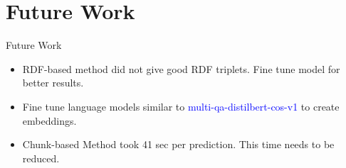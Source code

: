 \documentclass[aspectratio=169]{beamer}
\begin{document}
\section{Future Work}
\begin{frame}{Future Work}
\begin{itemize}
	\item RDF-based method did not give good RDF triplets. Fine tune model for better results.
	\item Fine tune language models similar to \textcolor{blue}{multi-qa-distilbert-cos-v1} to create embeddings.
	\item Chunk-based Method took 41 sec per prediction. This time needs to be reduced.
\end{itemize}
\end{frame}
\begin{frame}

\end{frame}



%      		
\end{document}
